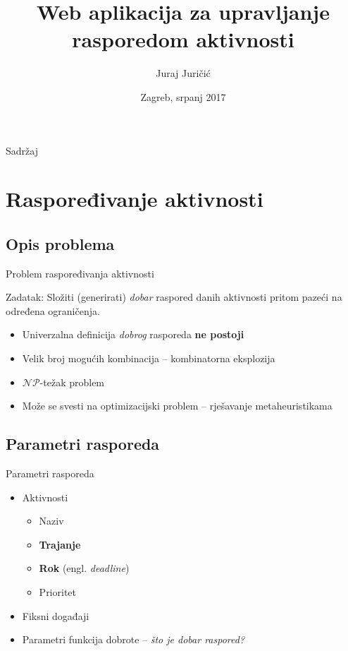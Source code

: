\documentclass{beamer}
\title{Web aplikacija za upravljanje rasporedom aktivnosti}
\author{Juraj Juričić}
\institute[Universities of Somewhere and Elsewhere] %
{
  Fakultet elektrotehnike i računarstva\\
  Sveučilište u Zagrebu
}
\date{Zagreb, srpanj 2017}
\begin{document}
\begin{frame}
  \titlepage
\end{frame}

\begin{frame}{Sadržaj}
  \tableofcontents
\end{frame}

\section{Raspoređivanje aktivnosti}

\subsection{Opis problema}

\begin{frame}{Problem raspoređivanja aktivnosti}
  \begin{block}{Zadatak:}
    Složiti (generirati) \textit{dobar} raspored danih aktivnosti pritom pazeći na određena ograničenja.
  \end{block}
    
  \begin{itemize}
    \item {Univerzalna definicija \textit{dobrog} rasporeda \textbf{ne postoji}}
    \item {Velik broj mogućih kombinacija -- kombinatorna eksplozija}
    \item {$\mathcal{NP}$-težak problem}
    \item {Može se svesti na optimizacijski problem -- rješavanje metaheuristikama}
  \end{itemize}
\end{frame}

\subsection{Parametri rasporeda}

\begin{frame}{Parametri rasporeda}
  \begin{itemize}
    \item {Aktivnosti}
    \begin{itemize}
      \item {Naziv}
      \item {\textbf{Trajanje}}
      \item {\textbf{Rok} (engl. \textit{deadline})}
      \item {Prioritet}
    \end{itemize}
    
    \item{Fiksni događaji}
  
    \item{Parametri funkcija dobrote -- \textit{što je dobar raspored?}}
  \end{itemize}
\end{frame}
\end{document}
